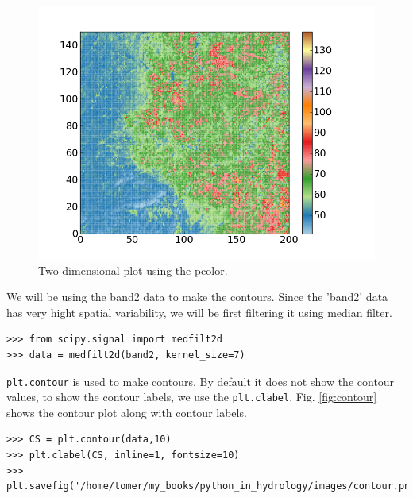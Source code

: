 \documentclass[10pt]{book}
\begin{document}
{\beforefig
\begin{figure}[h!]
  \centering
    \includegraphics[scale=0.5]{images/pcolor.png}
  \caption{Two dimensional plot using the pcolor.}
   \label{fig:pcolor}
\end{figure}
\afterfig

We will be using the band2 data to make the contours. Since the 'band2' data has very hight spatial variability, we will be first filtering it using median filter. 
\beforeverb \begin{verbatim}
>>> from scipy.signal import medfilt2d
>>> data = medfilt2d(band2, kernel_size=7)
\end{verbatim} \afterverb
{}

\verb"plt.contour" is used to make contours. By default it does not show the contour values, to show the contour labels, we use the \verb"plt.clabel". Fig. \ref{fig:contour} shows the contour plot along with contour labels. 
\beforeverb \begin{verbatim}
>>> CS = plt.contour(data,10)
>>> plt.clabel(CS, inline=1, fontsize=10)
>>> plt.savefig('/home/tomer/my_books/python_in_hydrology/images/contour.png')
\end{verbatim} \afterverb
{}

}
\end{document}

